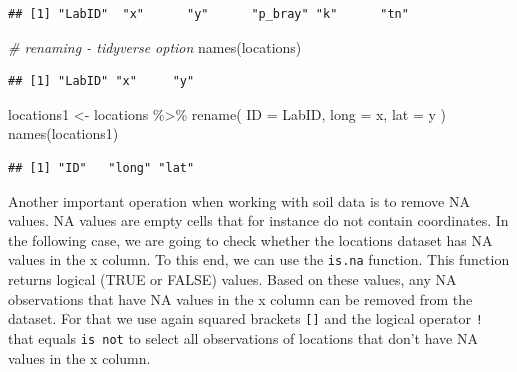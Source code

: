 \documentclass[
  10pt,
  b5paper,
  oneside]{book}
\newenvironment{Shaded}{\begin{snugshade}}{\end{snugshade}}
\newcommand{\AttributeTok}[1]{\textcolor[rgb]{0.77,0.63,0.00}{#1}}
\newcommand{\CommentTok}[1]{\textcolor[rgb]{0.56,0.35,0.01}{\textit{#1}}}
\newcommand{\FunctionTok}[1]{\textcolor[rgb]{0.00,0.00,0.00}{#1}}
\newcommand{\NormalTok}[1]{#1}
\newcommand{\OtherTok}[1]{\textcolor[rgb]{0.56,0.35,0.01}{#1}}
\newcommand{\SpecialCharTok}[1]{\textcolor[rgb]{0.00,0.00,0.00}{#1}}
\begin{document}
\begin{verbatim}
## [1] "LabID"  "x"      "y"      "p_bray" "k"      "tn"
\end{verbatim}

\begin{Shaded}
\begin{Highlighting}[]
\CommentTok{\# renaming {-} tidyverse option}
\FunctionTok{names}\NormalTok{(locations)}
\end{Highlighting}
\end{Shaded}

\begin{verbatim}
## [1] "LabID" "x"     "y"
\end{verbatim}

\begin{Shaded}
\begin{Highlighting}[]
\NormalTok{locations1 }\OtherTok{\textless{}{-}}\NormalTok{ locations }\SpecialCharTok{\%\textgreater{}\%} \FunctionTok{rename}\NormalTok{(}
  \AttributeTok{ID =}\NormalTok{ LabID,}
  \AttributeTok{long =}\NormalTok{ x,}
  \AttributeTok{lat =}\NormalTok{ y}
\NormalTok{)}
\FunctionTok{names}\NormalTok{(locations1)}
\end{Highlighting}
\end{Shaded}

\begin{verbatim}
## [1] "ID"   "long" "lat"
\end{verbatim}

Another important operation when working with soil data is to remove NA values. NA values are empty cells that for instance do not contain coordinates. In the following case, we are going to check whether the locations dataset has NA values in the x column. To this end, we can use the \texttt{is.na} function. This function returns logical (TRUE or FALSE) values. Based on these values, any NA observations that have NA values in the x column can be removed from the dataset. For that we use again squared brackets \texttt{{[}{]}} and the logical operator \texttt{!} that equals \texttt{is\ not} to select all observations of locations that don't have NA values in the x column.

\begin{Shaded}
\end{Shaded}
\end{document}
